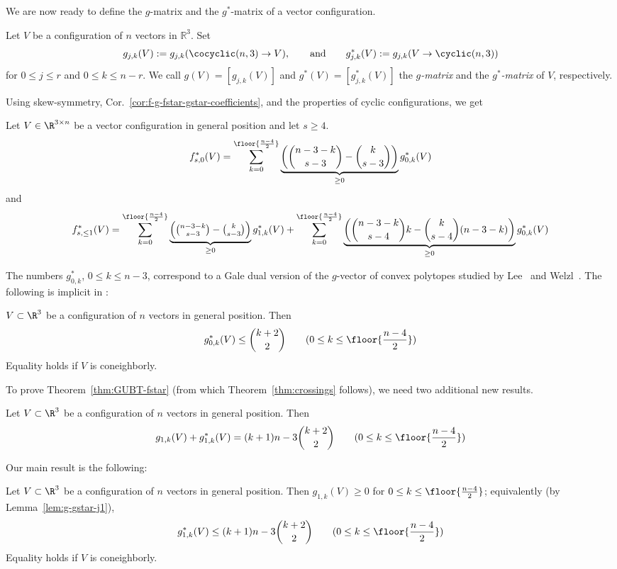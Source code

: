 We are now ready to define the $g$-matrix and the $g^*$-matrix of a vector configuration.
\begin{definition}
\label{def:g-matrix}
Let $V$ be a configuration of $n$ vectors in $\mathbb{R}^3$. Set 
\[
g_{j,k} (V) := g_{j,k} (\cocyclic(n,3) \to V), \qquad\textrm{and}\qquad g^*_{j,k} (V) := g_{j,k} (V \to \cyclic(n,3))
\]
for $0\leq j\leq r$ and $0\leq k\leq n-r$. We call $g(V)=[g_{j,k}(V)]$ and $g^*(V)=[g^*_{j,k}(V)]$ the \emph{$g$-matrix} and the \emph{$g^*$-matrix} of $V$, respectively.
\end{definition}
%
Using skew-symmetry, Cor.~\ref{cor:f-g-fstar-gstar-coefficients}, and the properties of cyclic configurations, we get 
\begin{lemma} 
\label{lem:fstar-gstar-b1}
Let $V\in \R^{3\times n}$ be a vector configuration in general position and let $s\geq 4$. 
\[
f_{s,0}^*(V) = \sum_{k=0}^{\floor{\frac{n-4}{2}}}\underbrace{\left( \binom{n-3-k}{s-3}-\binom{k}{s-3}\right)}_{\geq 0}  g^*_{0,k}(V)
\]
and
\[
f^*_{s,\leq 1}(V) = \sum_{k=0}^{\floor{\frac{n-4}{2}}} \underbrace{\textstyle \left( \binom{n-3-k}{s-3}-\binom{k}{s-3}\right)}_{\geq 0}  g^*_{1,k}(V) +  \sum_{k=0}^{\floor{\frac{n-4}{2}}} \underbrace{\left( \binom{n-3-k}{s-4} k - \binom{k}{s-4} (n-3-k) \right)}_{\geq 0}  g^*_{0,k}(V) 
\]
\end{lemma}
The numbers $g^*_{0,k}$, $0\leq k\leq n-3$, correspond to a Gale dual version of the $g$-vector of convex polytopes studied by Lee~\cite{Lee:1991aa} and Welzl~\cite{Welzl:2001aa}. The following is implicit in 
 \cite[Sec.~4]{Welzl:2001aa}:
 \begin{theorem} $V \subset \R^3$ be a configuration of $n$ vectors in general position. Then
 \label{thm:g-star-welzl}
\[g^*_{0,k}(V) \leq  \binom{k+2}{2}\qquad (0\leq k\leq \floor{\frac{n-4}{2}})\]
Equality holds if $V$ is coneighborly.
\end{theorem}
To prove Theorem~\ref{thm:GUBT-fstar} (from which Theorem~\ref{thm:crossings} follows), we need two additional new results.
%
\begin{lemma}
\label{lem:g-gstar-j1}
Let $V \subset \R^3$ be a configuration of $n$ vectors in general position. Then
\[g_{1,k}(V)+ g^*_{1,k}(V)=(k+1)n-3\binom{k+2}{2} \qquad (0\leq k\leq \floor{\frac{n-4}{2}})\]
\end{lemma}
Our main result is the following:
\begin{theorem} 
\label{thm:g1-rank3}
Let $V \subset \R^3$ be a configuration of $n$ vectors in general position. Then $g_{1,k}(V) \geq 0$ for $0\leq k\leq \floor{\frac{n-4}{2}}$; equivalently (by Lemma~\ref{lem:g-gstar-j1}),
\[g^*_{1,k}(V) \leq (k+1)n-3\binom{k+2}{2} \qquad (0\leq k\leq \floor{\frac{n-4}{2}} )\]
Equality holds if $V$ is coneighborly.
\end{theorem}
